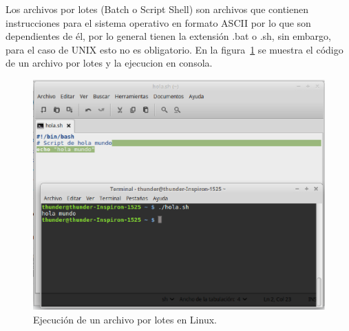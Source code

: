 Los archivos por lotes (Batch o Script Shell) \cite{Silberschatz1999} son
 archivos que contienen instrucciones para el sistema operativo en formato
 ASCII por lo que son dependientes de \'el, por lo general tienen la extensi\'on
 .bat o .sh, sin embargo, para el caso de UNIX esto no es obligatorio. En la
 figura~\ref{fig:script} se muestra el c\'odigo de un archivo por lotes y la 
 ejecucion en consola.



\begin{figure}[h]
\centering
\includegraphics[width=0.7\columnwidth]{chap2/Imagenes/Script.eps}
\caption{Ejecuci\'on de un archivo por lotes en Linux.}
\label{fig:script}
\end{figure}